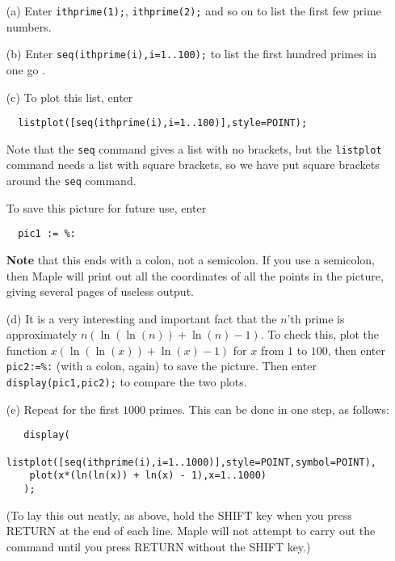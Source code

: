 \documentclass[a4paper,10pt]{amsbook}
\numberwithin{example}{chapter}
\begin{document}
\begin{exercise}\label{ex-plotprimes}
 \begin{itemize}
  \item[(a)] Enter \verb~ithprime(1);~, \verb~ithprime(2);~ and so on
   to list the first few prime numbers. 
  \item[(b)] Enter \verb~seq(ithprime(i),i=1..100);~ to list the first
   hundred primes in one go \note{\NOTEseq}. 
  \item[(c)] To plot this list, enter 
\begin{verbatim}
  listplot([seq(ithprime(i),i=1..100)],style=POINT);
\end{verbatim}
   Note that the \verb~seq~ command gives a list with no
   brackets, but the \verb~listplot~ command needs a list
   with square brackets, so we have put square brackets
   around the \verb~seq~ command.

   To save this picture for future use, enter 
\begin{verbatim}
  pic1 := %:
\end{verbatim}
   \textbf{Note} that this ends with a colon, not a semicolon.  If you
   use a semicolon, then Maple will print out all the coordinates of
   all the points in the picture, giving several pages of useless
   output.  
 \item[(d)] It is a very interesting and important fact that the $n$'th
  prime is approximately $n(\ln(\ln(n))+\ln(n)-1)$.  To check this,
  plot the function $x(\ln(\ln(x))+\ln(x)-1)$ for $x$ from $1$ to
  $100$, then enter \verb~pic2:=%:~
  (with a colon, again) to save the picture.  Then enter
  \verb~display(pic1,pic2);~ to compare the two plots. 
 \item[(e)] Repeat for the first $1000$ primes.  This can be done in
  one step, as follows:
\begin{verbatim}
   display(
    listplot([seq(ithprime(i),i=1..1000)],style=POINT,symbol=POINT),
    plot(x*(ln(ln(x)) + ln(x) - 1),x=1..1000)
   );
\end{verbatim}
  (To lay this out neatly, as above, hold the SHIFT key when you press
  RETURN at the end of each line.  Maple will not attempt to carry out
  the command until you press RETURN without the SHIFT key.) 
 \end{itemize}
\end{exercise}
\end{document}
